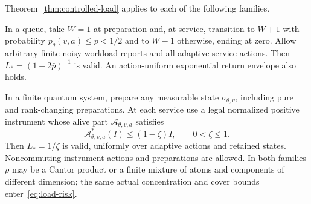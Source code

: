 \begin{corollary}\label{cor:raw-geometries}
Theorem~\ref{thm:controlled-load} applies to each of the following families.

In a queue, take $W=1$ at preparation and, at service, transition to $W+1$ with probability $p_\theta(v,a)\le\bar p<1/2$ and to $W-1$ otherwise, ending at zero. Allow arbitrary finite noisy workload reports and all adaptive service actions. Then $L_*=(1-2\bar p)^{-1}$ is valid. An action-uniform exponential return envelope also holds.

In a finite quantum system, prepare any measurable state $\sigma_{\theta,v}$, including pure and rank-changing preparations. At each service use a legal normalized positive instrument whose alive part $\mathcal A_{\theta,v,a}$ satisfies
\[
 \mathcal A_{\theta,v,a}^*(I)\le(1-\zeta)I,
 \qquad 0<\zeta\le1.
\]
Then $L_*=1/\zeta$ is valid, uniformly over adaptive actions and retained states. Noncommuting instrument actions and preparations are allowed. In both families $\rho$ may be a Cantor product or a finite mixture of atoms and components of different dimension; the same actual concentration and cover bounds enter~\eqref{eq:load-risk}.
\end{corollary}
